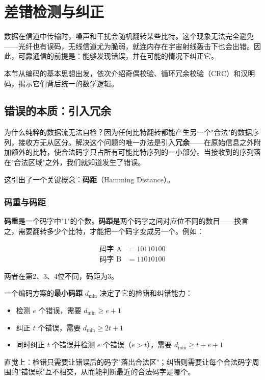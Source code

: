 \section{差错检测与纠正}

数据在信道中传输时，噪声和干扰会随机翻转某些比特。这个现象无法完全避免——光纤也有误码，无线信道尤为脆弱，就连内存在宇宙射线轰击下也会出错。因此，可靠通信的前提是：能够发现错误，并在可能的情况下纠正它。

本节从编码的基本思想出发，依次介绍奇偶校验、循环冗余校验（CRC）和汉明码，揭示它们背后统一的数学逻辑。

\subsection{错误的本质：引入冗余}

为什么纯粹的数据流无法自检？因为任何比特翻转都能产生另一个"合法"的数据序列，接收方无从区分。解决这个问题的唯一办法是引入\textbf{冗余}——在原始信息之外附加额外的比特，使合法码字只占所有可能比特序列的一小部分。当接收到的序列落在"合法区域"之外，我们就知道发生了错误。

这引出了一个关键概念：\textbf{码距}（Hamming Distance）。

\subsubsection{码重与码距}

\textbf{码重}是一个码字中"1"的个数。\textbf{码距}是两个码字之间对应位不同的数目——换言之，需要翻转多少个比特，才能把一个码字变成另一个。例如：

\begin{align*}
    \text{码字 A} &= 10110100 \\
    \text{码字 B} &= 11010100
\end{align*}

两者在第2、3、4位不同，码距为3。

一个编码方案的\textbf{最小码距} $d_{\min}$ 决定了它的检错和纠错能力：

\begin{itemize}
    \item 检测 $e$ 个错误，需要 $d_{\min} \geq e + 1$
    \item 纠正 $t$ 个错误，需要 $d_{\min} \geq 2t + 1$
    \item 同时纠正 $t$ 个错误并检测 $e$ 个错误（$e > t$），需要 $d_{\min} \geq t + e + 1$
\end{itemize}

直觉上：检错只需要让错误后的码字"落出合法区"；纠错则需要让每个合法码字周围的"错误球"互不相交，从而能判断最近的合法码字是哪个。

